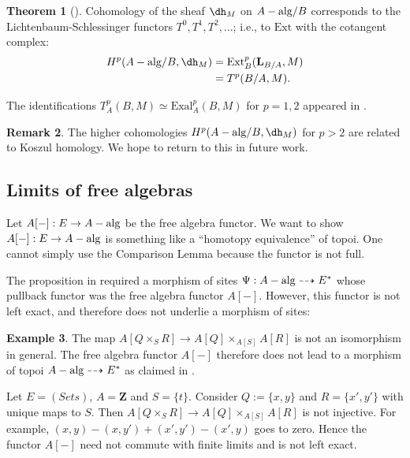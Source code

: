 \documentclass[11pt,reqno]{amsart}
\theoremstyle{definition}
\newtheorem{theorem}{Theorem}[section]
\newtheorem{example}[theorem]{Example}
\newtheorem{remark}[theorem]{Remark}
\newcommand{\ZZ}{\mathbf{Z}}
\newcommand{\dd}[1]{\dh_{#1}}
\newcommand{\Exal}{\textrm{Exal}}
\newcommand{\Ext}{\textrm{Ext}}
\newcommand{\ccx}[1]{\mathbf{L}_{#1}}
\newcommand{\Aalg}{A-{\rm alg}}
\begin{document}
\begin{theorem}[{\cite[Theorem 4]{wisealgs1}}]\label{thm:algcohomisexal}
Cohomology of the sheaf $\dd{M}$ on $\Aalg/B$ corresponds to the Lichtenbaum-Schlessinger functors $T^0, T^1, T^2, \dots$;
i.e., to $\Ext$ with the cotangent complex: 
\[
\begin{split}
H^p(\Aalg/B, \dd{M}) &= \Ext^p_B(\ccx{B/A}, M)  \\
    &=T^p(B/A, M).
\end{split}
\]
\end{theorem}

The identifications $T^p_A(B, M) \simeq \Exal^p_A(B, M)$ for $p = 1, 2$ appeared in \cite[Theorem 4.1.2, 4.2.2]{lichtenbaumschlessinger}. 


\begin{remark}
The higher cohomologies $H^p(\Aalg/B, \dd{M})$ for $p > 2$ are related to Koszul homology. We hope to return to this in future work. 
\end{remark}



\subsection{Limits of free algebras}
\label{sec:limits-of-free-alg}


Let $A[-] : E \rightarrow \Aalg$ be the free algebra functor. We want to show $A[-] : E \to \Aalg$ is something like a ``homotopy equivalence'' of topoi. One cannot simply use the Comparison Lemma \cite[Theorem III.4.1]{SGA4} because the functor is not full. 

The proposition in \cite[\S 9]{wisealgs1} required a morphism of sites $\Psi : \Aalg \dashrightarrow E^*$ whose pullback functor was the free algebra functor $A[-]$.  However, this functor is not left exact, and therefore does not underlie a morphism of sites:


\begin{example}\label{freeproductnoiso}
The map $A[Q \times_S R] \rightarrow A[Q] \times_{A[S]} A[R]$ is not an isomorphism in general. The free algebra functor $A[-]$ therefore does not lead to a morphism of topoi $\Aalg \dashrightarrow E^*$ as claimed in \cite[pg. 189]{wisealgs1}. 

Let $E = (Sets)$, $A = \ZZ$ and $S = \{t\}$. Consider $Q := \{x, y\}$ and $R = \{x', y'\}$ with unique maps to $S$. Then $A[Q \times_S R] \rightarrow A[Q] \times_{A[S]} A[R]$ is not injective. For example, $(x, y) - (x, y') + (x', y') - (x', y)$ goes to zero. Hence the functor $A[-]$ need not commute with finite limits and is not left exact. 

 
\end{example}
\end{document}

